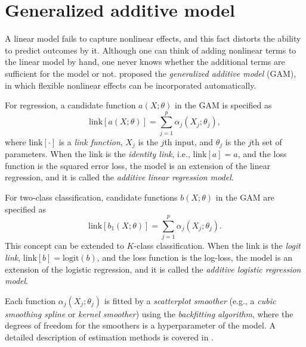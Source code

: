 \documentclass[12pt]{article}
\begin{document}
\section{Generalized additive model}
A linear model fails to capture nonlinear effects, and this fact distorts the ability to predict outcomes by it. Although one can think of adding nonlinear terms to the linear model by hand, one never knows whether the additional terms are sufficient for the model or not. \textcite{Hastie1986} proposed the {\it generalized additive model} (GAM), in which flexible nonlinear effects can be incorporated automatically.

For regression, a candidate function $a(X;\theta)$ in the GAM is specified as
\begin{equation*}
{\mathrm {link}}[a(X;\theta)] = \sum_{j=1}^p \alpha_j(X_j;\theta_j),
\end{equation*}
where ${\mathrm {link}}[\cdot]$ is a {\it link function}, $X_j$ is the $j$th input, and $\theta_j$ is the $j$th set of parameters. When the link is the {\it identity link}, i.e., ${\mathrm {link}}[a] = a$, and the loss function is the squared error loss, the model is an extension of the linear regression, and it is called the {\it additive linear regression model}.

For two-class classification, candidate functions $b(X;\theta)$ in the GAM are specified as
\begin{equation*}
{\mathrm {link}}[b_1(X;\theta)] = \sum_{j=1}^p \alpha_j(X_j;\theta_j).
\end{equation*}
This concept can be extended to $K$-class classification. When the link is the {\it logit link}, ${\mathrm {link}}[b] = {\mathrm {logit}}(b)$, and the loss function is the log-loss, the model is an extension of the logistic regression, and it is called the {\it additive logistic regression model}.

Each function $\alpha_j(X_j;\theta_j)$ is fitted by a {\it scatterplot smoother} (e.g., a {\it cubic smoothing spline} or {\it kernel smoother}) using the {\it backfitting algorithm}, where the degrees of freedom for the smoothers is a hyperparameter of the model. A detailed description of estimation methods is covered in \textcite{Hastie1990}.
\end{document}
